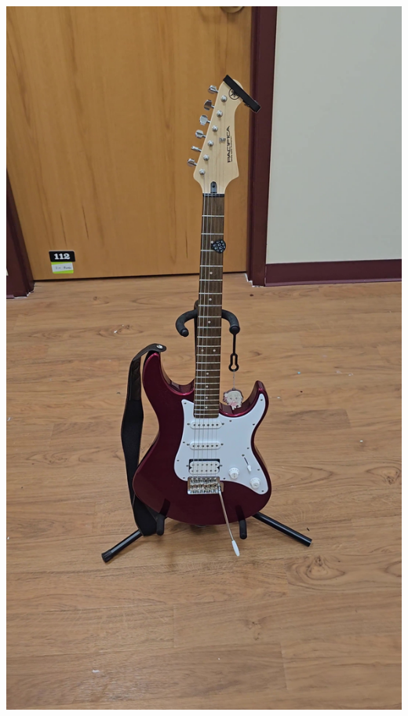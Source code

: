 \documentclass{article}
\begin{document}
\begin{center}
    \includegraphics[scale=0.02]{images/guitar3.jpg}\\

\end{center}
\end{document}
